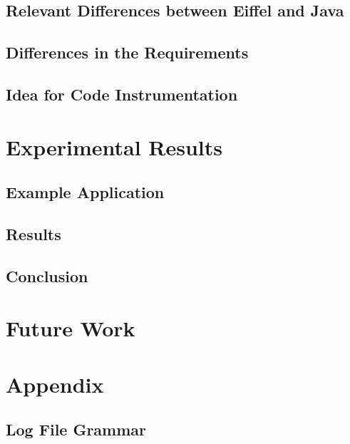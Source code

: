 \documentclass[a4paper,10pt]{report}
\begin{document}
\subsection{Relevant Differences between Eiffel and Java}
\subsection{Differences in the Requirements}
\subsection{Idea for Code Instrumentation}



\section{Experimental Results}
\subsection{Example Application}
\subsection{Results}
\subsection{Conclusion}

\section{Future Work}
\section{Appendix}

\subsection{Log File Grammar}
\end{document}
